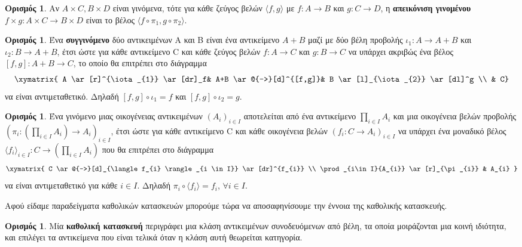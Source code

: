 \documentclass [a4paper,11pt] {book}
\theoremstyle{definition}
\theoremstyle{definition}
\newtheorem{definition}[theorem]{Ορισμός}
\begin{document}
\begin{definition}
Αν $A \times C,B\times D$ είναι γινόμενα, τότε για κάθε ζεύγος βελών $\langle f,g\rangle$ με $f:A\to B$ και $g:C\to D$, η \textbf{απεικόνιση γινομένου} $f\times g:A \times C \to B\times D$ είναι το βέλος $\langle f\circ \pi_{1}, g \circ \pi_{2}\rangle$.
\end{definition}
\begin{definition}\label{coproduct}
Ένα \textbf{συγγινόμενο} δύο αντικειμένων Α και Β είναι ένα αντικείμενο $A+B$ μαζί με δύο βέλη προβολής $\iota_{1}:A\to A+B$ και $\iota_{2}:B\to A+B$, έτσι ώστε για κάθε αντικείμενο C και κάθε ζεύγος βελών $f:A\to C$ και $g:B\to C$ να υπάρχει ακριβώς ένα βέλος $[f,g] : A+B \to C$, το οποίο θα επιτρέπει στο διάγραμμα
\begin{displaymath}
\xymatrix{
A \ar[r]^{\iota_{1}} \ar[dr]_f& A+B \ar@{-->}[d]^{[f,g]}& B \ar[l]_{\iota_{2}} \ar[dl]^g \\
& C}
\end{displaymath}
να είναι αντιμεταθετικό. Δηλαδή $[f,g]\circ\iota_1 =f $ και $[f,g]\circ \iota_2 = g$.
\end{definition}
\begin{definition}\label{product}
Ένα γινόμενο μιας οικογένειας αντικειμένων $(A_{i})_{i\in I}$ αποτελείται από ένα αντικείμενο $\prod_{i\in I}{A_{i}}$ και μια οικογένεια βελών προβολής $(\pi_{i}:(\prod_{i\in I}{A_{i}})\to A_{i})_{i \in I}$, έτσι ώστε για κάθε αντικείμενο C και κάθε οικογένεια βελών $(f_{i}:C \to A_{i})_{i \in I}$ να υπάρχει ένα μοναδικό βέλος $\langle f_{i} \rangle_{i \in I} : C \to (\prod_{i\in I}{A_{i}})$ που θα επιτρέπει στο διάγραμμα
\begin{displaymath}
\xymatrix{
C \ar@{-->}[d]_{\langle f_{i} \rangle_{i \in I}} \ar[dr]^{f_{i}} \\
\prod_{i\in I}{A_{i}} \ar[r]_{\pi_{i}} & A_{i}
}
\end{displaymath}
να είναι αντιμεταθετικό για κάθε $i \in I$. Δηλαδή $\pi_i\circ\langle f_i \rangle =f_i$, $\forall i\in I$. 
\end{definition}
Αφού είδαμε παραδείγματα καθολικών κατασκευών μπορούμε τώρα να αποσαφηνίσουμε την έννοια της καθολικής κατασκευής.
\begin{definition}\label{universalConstruction}
Μία \textbf{καθολική κατασκευή} περιγράφει μια κλάση αντικειμένων συνοδευόμενων από βέλη, τα οποία μοιράζονται μια κοινή ιδιότητα, και επιλέγει τα αντικείμενα που είναι τελικά όταν η κλάση αυτή θεωρείται κατηγορία.
\end{definition}
\end{document}
